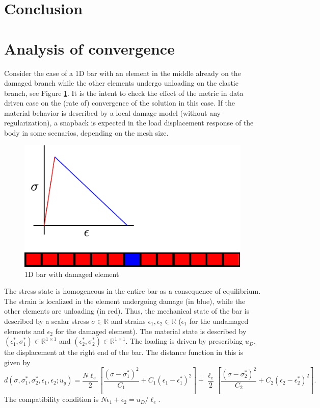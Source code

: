 \documentclass[10pt]{elsarticle}
\begin{document}
\section{Conclusion}



\appendix

\section{Analysis of convergence \label{appx_convergence}}
Consider the case of a 1D bar with an element in the middle already on the damaged branch while the other elements undergo unloading on the elastic branch, see Figure \ref{1D_bar_dam_elem}. It is the intent to check the effect of the metric in data driven case on the (rate of) convergence of the solution in this case. If the material behavior is described by a local damage model (without any regularization), a snapback is expected in the load displacement response of the body in some scenarios, depending on the mesh size.
\begin{figure}
	\centering
	\includegraphics[scale=1.2]{1D_bar_dam_elem.pdf}
	\caption{1D bar with damaged element\label{1D_bar_dam_elem}}
\end{figure}

The stress state is homogeneous in the entire bar as a consequence of equilibrium. The strain is localized in the element undergoing damage (in blue), while the other elements are unloading (in red). Thus, the mechanical state of the bar is described by a scalar stress $\sigma \in \mathbb{R}$ and strains $\epsilon_1, \epsilon_2 \in \mathbb{R}$ ($\epsilon_1$ for the undamaged elements and $\epsilon_2$ for the damaged element). The material state is described by $(\epsilon_1^*, \sigma_1^*) \in \mathbb{R}^{1\times 1}$ and $(\epsilon_2^*, \sigma_2^*) \in \mathbb{R}^{1\times 1}$. The loading is driven by prescribing $u_D$, the displacement at the right end of the bar. The distance function in this is given by 
\begin{equation}
	d(\sigma,\sigma_1^*,\sigma_2^*,\epsilon_1,\epsilon_2;u_g) = \frac{N \ell_e}{2} \left[ \frac{(\sigma - \sigma_1^*)^2}{C_1} +  C_1(\epsilon_1 - \epsilon_1^*)^2 \right] + \frac{\ell_e}{2}  \left[ \frac{(\sigma - \sigma_2^*)^2}{C_2} +  C_2(\epsilon_2 - \epsilon_2^*)^2 \right].
\end{equation}
The compatibility condition is $N \epsilon_1 + \epsilon_2 = u_D/\ell_e$.
\end{document}
